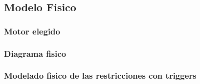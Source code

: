 \subsection{Modelo Fisico}
\subsubsection{Motor elegido}
\subsubsection{Diagrama fisico}
\subsubsection{Modelado fisico de las restricciones con triggers}
